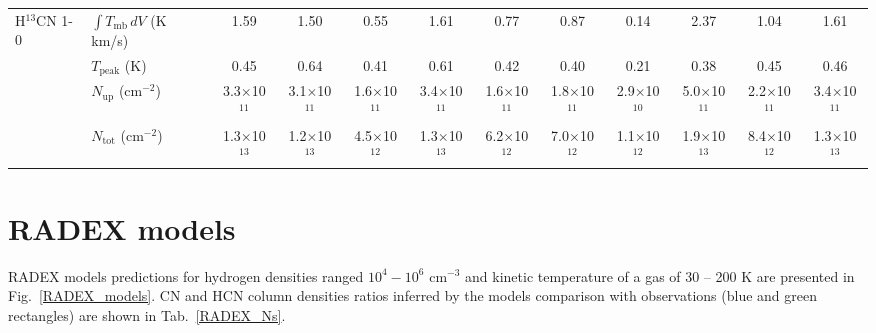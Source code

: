 \documentclass{aa}
\begin{document}
\begin{appendix}
\begin{sidewaystable*}
\begin{tabular}{l l c c c c c c c c c c}
\multirow{4}{*}{H$^{13}$CN 1-0} & $\int{T_{\mathrm{mb}} \, dV}$ (K km/s) & 1.59 & 1.50 & 0.55 & 1.61 & 0.77 & 0.87 & 0.14 & 2.37 & 1.04 & 1.61 \\
& $T_\mathrm{peak}$ (K) & 0.45 & 0.64 & 0.41 & 0.61 & 0.42 & 0.40 & 0.21 & 0.38 & 0.45 & 0.46 \\
& $N_\mathrm{up}$ (cm$^{-2}$) & 3.3$\times$10$^{11}$ & 3.1$\times$10$^{11}$ & 1.6$\times$10$^{11}$ & 3.4$\times$10$^{11}$ & 1.6$\times$10$^{11}$ & 1.8$\times$10$^{11}$ & 2.9$\times$10$^{10}$ & 5.0$\times$10$^{11}$ & 2.2$\times$10$^{11}$ & 3.4$\times$10$^{11}$ \\
& $N_\mathrm{tot}$ (cm$^{-2}$) & 1.3$\times$10$^{13}$ & 1.2$\times$10$^{13}$ & 4.5$\times$10$^{12}$ & 1.3$\times$10$^{13}$ & 6.2$\times$10$^{12}$ & 7.0$\times$10$^{12}$ & 1.1$\times$10$^{12}$ & 1.9$\times$10$^{13}$ & 8.4$\times$10$^{12}$ & 1.3$\times$10$^{13}$\\

\hline\hline
\end{tabular}
\end{sidewaystable*}

\section{RADEX models}

RADEX models predictions for hydrogen densities ranged $10^{4}-10^{6}$ cm$^{-3}$ and kinetic temperature of a gas of 30 – 200 K are presented in Fig.~\ref{RADEX_models}. CN and HCN column densities ratios inferred by the models comparison with observations (blue and green rectangles) are shown in Tab.~\ref{RADEX_Ns}.


\end{appendix}
\end{document}
